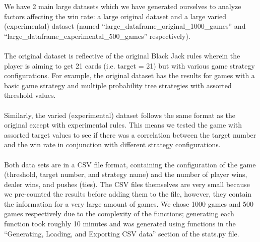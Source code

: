 \documentclass[fontsize=11pt]{article}
\begin{document}
We have 2 main large datasets which we have generated ourselves to analyze factors affecting the win rate: a large original dataset and a large varied (experimental) dataset (named “large\_dataframe\_original\_1000\_games” and “large\_dataframe\_experimental\_500\_games” respectively).
\\\\
The original dataset is reflective of the original Black Jack rules wherein the player is aiming to get 21 cards (i.e. target = 21) but with various game strategy configurations. For example, the original dataset has the results for games with a basic game strategy and multiple probability tree strategies with assorted threshold values.
\\\\
Similarly, the varied (experimental) dataset follows the same format as the original except with experimental rules. This means we tested the game with assorted target values to see if there was a correlation between the target number and the win rate in conjunction with different strategy configurations.
\\\\
Both data sets are in a CSV file format, containing the configuration of the game (threshold, target number, and strategy name) and the number of player wins, dealer wins, and pushes (ties). The CSV files themselves are very small because we pre-counted the results before adding them to the file, however, they contain the information for a very large amount of games. We chose 1000 games and 500 games respectively due to the complexity of the functions; generating each function took roughly 10 minutes and was generated using functions in the “Generating, Loading, and Exporting CSV data” section of the stats.py file.
\end{document}
